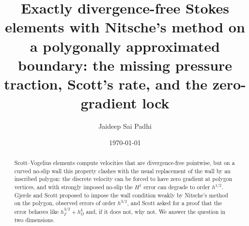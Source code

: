 \documentclass[11pt,reqno]{amsart}
\theoremstyle{plain}
\theoremstyle{definition}
\begin{document}
\title[Scott--Vogelius--Nitsche on polygonal boundaries]{Exactly divergence-free Stokes elements with Nitsche's method on a polygonally approximated boundary: the missing pressure traction, Scott's rate, and the zero-gradient lock}

\author{Jaideep Sai Padhi}
\address{Department of Computer Science, Purdue University, West Lafayette, IN 47907, USA}
\date{\today}

\begin{abstract}
Scott--Vogelius elements compute velocities that are divergence-free pointwise, but on a curved no-slip wall this property clashes with the usual replacement of the wall by an inscribed polygon: the discrete velocity can be forced to have zero gradient at polygon vertices, and with strongly imposed no-slip the $H^1$ error can degrade to order $h^{1/2}$. Gjerde and Scott proposed to impose the wall condition weakly by Nitsche's method on the polygon, observed errors of order $h^{3/2}$, and Scott asked for a proof that the error behaves like $h_\Gamma^{3/2}+h_\Omega^k$ and, if it does not, why not. We answer the question in two dimensions.


\end{abstract}
\end{document}
